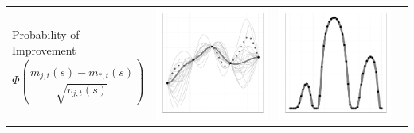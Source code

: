 \documentclass[a4paper,natbib]{apa6}
\begin{document}
\begin{table}[h!]
\begin{tabular}{lccc}
\parbox[b]{5cm}{Probability of Improvement $$\Phi\left(\frac{m_{j,t}(s)-m_{*,t}(s)}{\sqrt{v_{j,t}(s)}}\right)$$\\}& 
\includegraphics[scale=0.2]{figure12.pdf} &  
\includegraphics[scale=0.2]{figure13.pdf} &  

\end{tabular}
\end{table}
\end{document}
